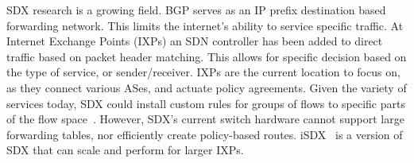 SDX research is a growing field. BGP serves as an IP prefix destination based forwarding network. This limits the internet’s ability to service specific traffic. At Internet Exchange Points (IXPs) an SDN controller has been added to direct traffic based on packet header matching. This allows for specific decision based on the type of service, or sender/receiver. IXPs are the current location to focus on, as they connect various ASes, and actuate policy agreements. Given the variety of services today, SDX could install custom rules for groups of flows to specific parts of the flow space~\cite{SDX1}. However, SDX’s current switch hardware cannot support large forwarding tables, nor efficiently create policy-based routes. iSDX~\cite{SDX2} is a version of SDX that can scale and perform for larger IXPs.  


